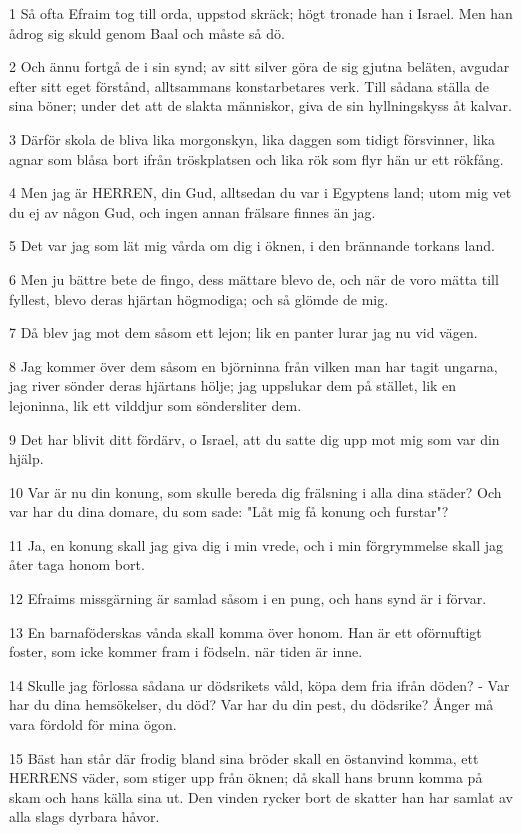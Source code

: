 \par 1 Så ofta Efraim tog till orda, uppstod skräck; högt tronade han i Israel. Men han ådrog sig skuld genom Baal och måste så dö.
\par 2 Och ännu fortgå de i sin synd; av sitt silver göra de sig gjutna beläten, avgudar efter sitt eget förstånd, alltsammans konstarbetares verk. Till sådana ställa de sina böner; under det att de slakta människor, giva de sin hyllningskyss åt kalvar.
\par 3 Därför skola de bliva lika morgonskyn, lika daggen som tidigt försvinner, lika agnar som blåsa bort ifrån tröskplatsen och lika rök som flyr hän ur ett rökfång.
\par 4 Men jag är HERREN, din Gud, alltsedan du var i Egyptens land; utom mig vet du ej av någon Gud, och ingen annan frälsare finnes än jag.
\par 5 Det var jag som lät mig vårda om dig i öknen, i den brännande torkans land.
\par 6 Men ju bättre bete de fingo, dess mättare blevo de, och när de voro mätta till fyllest, blevo deras hjärtan högmodiga; och så glömde de mig.
\par 7 Då blev jag mot dem såsom ett lejon; lik en panter lurar jag nu vid vägen.
\par 8 Jag kommer över dem såsom en björninna från vilken man har tagit ungarna, jag river sönder deras hjärtans hölje; jag uppslukar dem på stället, lik en lejoninna, lik ett vilddjur som söndersliter dem.
\par 9 Det har blivit ditt fördärv, o Israel, att du satte dig upp mot mig som var din hjälp.
\par 10 Var är nu din konung, som skulle bereda dig frälsning i alla dina städer? Och var har du dina domare, du som sade: "Låt mig få konung och furstar"?
\par 11 Ja, en konung skall jag giva dig i min vrede, och i min förgrymmelse skall jag åter taga honom bort.
\par 12 Efraims missgärning är samlad såsom i en pung, och hans synd är i förvar.
\par 13 En barnaföderskas vånda skall komma över honom. Han är ett oförnuftigt foster, som icke kommer fram i födseln. när tiden är inne.
\par 14 Skulle jag förlossa sådana ur dödsrikets våld, köpa dem fria ifrån döden? - Var har du dina hemsökelser, du död? Var har du din pest, du dödsrike? Ånger må vara fördold för mina ögon.
\par 15 Bäst han står där frodig bland sina bröder skall en östanvind komma, ett HERRENS väder, som stiger upp från öknen; då skall hans brunn komma på skam och hans källa sina ut. Den vinden rycker bort de skatter han har samlat av alla slags dyrbara håvor.

